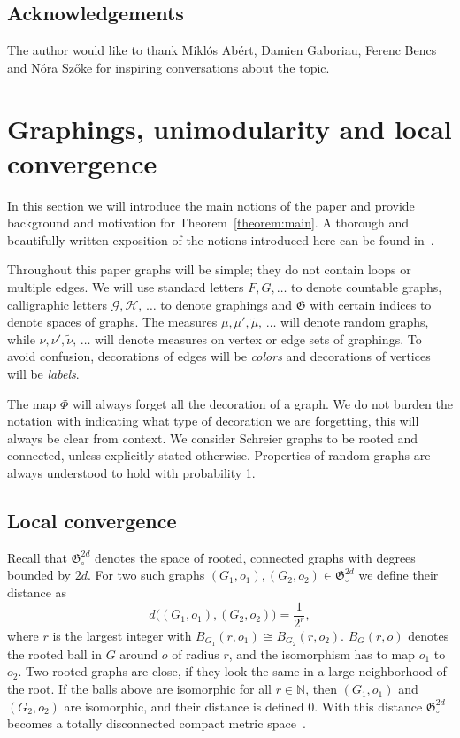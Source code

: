 \documentclass[11pt]{article}
\theoremstyle{definition}
\numberwithin{equation}{section}
\numberwithin{figure}{section}
\numberwithin{table}{section}
\newcommand{\N}{\mathbb{N}}
\newcommand{\G}{\mathcal{G}}
\newcommand{\clH}{\mathcal{H}}
\newcommand{\GoG}{\mathfrak{G}}
\begin{document}

\subsection*{Acknowledgements}
The author would like to thank Miklós Abért, Damien Gaboriau, Ferenc Bencs and Nóra Sz{\H o}ke for inspiring conversations about the topic.

\section{Graphings, unimodularity and local convergence} \label{section:preliminaries}

In this section we will introduce the main notions of the paper and provide background and motivation for Theorem~\ref{theorem:main}. A thorough and beautifully written exposition of the notions introduced here can be found in~\cite{lovasz2012large}.

Throughout this paper graphs will be simple; they do not contain loops or multiple edges. We will use standard letters $F,G, \ldots$ to denote countable graphs, calligraphic letters $\G, \clH,\,\ldots$ to denote graphings and $\GoG$ with certain indices to denote spaces of graphs. The measures $\mu, \mu', \widetilde{\mu},\,\ldots$ will denote random graphs, while $\nu, \nu', \widetilde{\nu},\,\ldots$ will denote measures on vertex or edge sets of graphings. To avoid confusion, decorations of edges will be \emph{colors} and decorations of vertices will be \emph{labels}.

The map $\Phi$ will always forget all the decoration of a graph. We do not burden the notation with indicating what type of decoration we are forgetting, this will always be clear from context. We consider Schreier graphs to be rooted and connected, unless explicitly stated otherwise. Properties of random graphs are always understood to hold with probability 1.

\subsection{Local convergence}

Recall that $\GoG_{\circ}^{2d}$ denotes the space of rooted, connected graphs with degrees bounded by $2d$. For two such graphs $(G_1, o_1), (G_2, o_2) \in \GoG_{\circ}^{2d}$ we define their distance as
\[
d\big(\left(G_1, o_1\right), \left(G_2, o_2\right)\big) = \frac{1}{2^r},
\]
where $r$ is the largest integer with $B_{G_1}(r,o_1) \cong B_{G_2}(r,o_2)$. $B_G(r,o)$ denotes the rooted ball in $G$ around $o$ of radius $r$, and the isomorphism has to map $o_1$ to $o_2$. Two rooted graphs are close, if they look the same in a large neighborhood of the root. If the balls above are isomorphic for all $r \in \N$, then $(G_1,o_1)$ and $(G_2,o_2)$ are isomorphic, and their distance is defined 0. With this distance $\GoG_{\circ}^{2d}$ becomes a totally disconnected compact metric space~\cite[Section~18.3.1]{lovasz2012large}.
\end{document}
